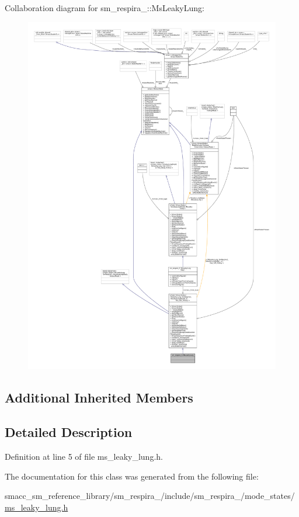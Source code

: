 Collaboration diagram for sm\+\_\+respira\+\_\+:\+:Ms\+Leaky\+Lung\+:
\nopagebreak
\begin{figure}[H]
\begin{center}
\leavevmode
\includegraphics[width=350pt]{classsm__respira__1_1_1MsLeakyLung__coll__graph}
\end{center}
\end{figure}
\subsection*{Additional Inherited Members}


\subsection{Detailed Description}


Definition at line 5 of file ms\+\_\+leaky\+\_\+lung.\+h.



The documentation for this class was generated from the following file\+:\begin{DoxyCompactItemize}
\item 
smacc\+\_\+sm\+\_\+reference\+\_\+library/sm\+\_\+respira\+\_/include/sm\+\_\+respira\+\_/mode\+\_\+states/\hyperlink{ms__leaky__lung_8h}{ms\+\_\+leaky\+\_\+lung.\+h}\end{DoxyCompactItemize}
